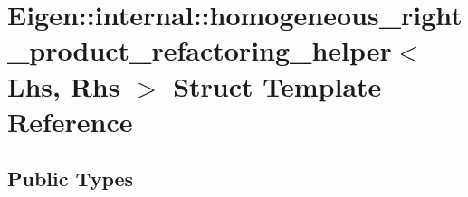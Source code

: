 \hypertarget{struct_eigen_1_1internal_1_1homogeneous__right__product__refactoring__helper}{}\section{Eigen\+:\+:internal\+:\+:homogeneous\+\_\+right\+\_\+product\+\_\+refactoring\+\_\+helper$<$ Lhs, Rhs $>$ Struct Template Reference}
\label{struct_eigen_1_1internal_1_1homogeneous__right__product__refactoring__helper}
\subsection*{Public Types}
